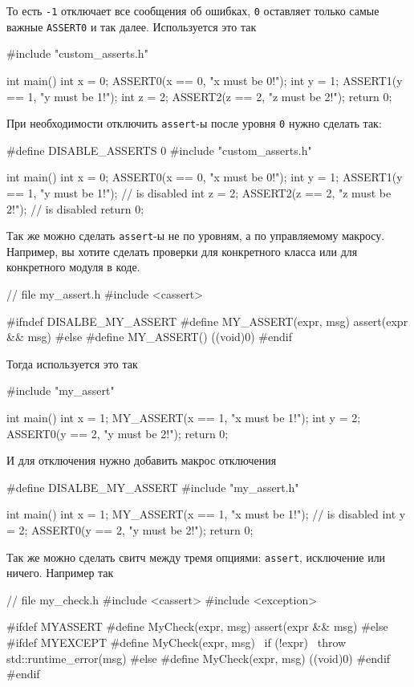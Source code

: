 То есть \verb"-1" отключает все сообщения об ошибках, \verb"0" оставляет только самые важные \verb"ASSERT0" и так далее.
Используется это так
\begin{cppcode}
#include "custom_asserts.h"

int main() {
  int x = 0;
  ASSERT0(x == 0, "x must be 0!");
  int y = 1;
  ASSERT1(y == 1, "y must be 1!");
  int z = 2;
  ASSERT2(z == 2, "z must be 2!");
  return 0;
}
\end{cppcode}
При необходимости отключить \verb"assert"-ы после уровня \verb"0" нужно сделать так:
\begin{cppcode}
#define DISABLE_ASSERTS 0
#include "custom_asserts.h"

int main() {
  int x = 0;
  ASSERT0(x == 0, "x must be 0!");
  int y = 1;
  ASSERT1(y == 1, "y must be 1!"); // is disabled
  int z = 2;
  ASSERT2(z == 2, "z must be 2!"); // is disabled
  return 0;
}
\end{cppcode}
Так же можно сделать \verb"assert"-ы не по уровням, а по управляемому макросу.
Например, вы хотите сделать проверки для конкретного класса или для конкретного модуля в коде.
\begin{cppcode}
// file my_assert.h
#include <cassert>

#ifndef DISALBE_MY_ASSERT
#define MY_ASSERT(expr, msg) assert(expr && msg)
#else
#define MY_ASSERT() ((void)0)
#endif
\end{cppcode}
Тогда используется это так
\begin{cppcode}
#include "my_assert"

int main() {
  int x = 1;
  MY_ASSERT(x == 1, "x must be 1!");
  int y = 2;
  ASSERT0(y == 2, "y must be 2!");
  return 0;
}
\end{cppcode}
И для отключения нужно добавить макрос отключения
\begin{cppcode}
#define DISALBE_MY_ASSERT
#include "my_assert.h"

int main() {
  int x = 1;
  MY_ASSERT(x == 1, "x must be 1!"); // is disabled
  int y = 2;
  ASSERT0(y == 2, "y must be 2!");
  return 0;
}
\end{cppcode}
Так же можно сделать свитч между тремя опциями: \verb"assert", исключение или ничего.
Например так
\begin{cppcode}
// file my_check.h
#include <cassert>
#include <exception>

#ifdef MYASSERT
#define MyCheck(expr, msg) assert(expr && msg)
#else
#ifdef MYEXCEPT
#define MyCheck(expr, msg)       \
  if (!expr)                     \
  throw std::runtime_error(msg)
#else
#define MyCheck(expr, msg) ((void)0)
#endif
#endif
\end{cppcode}
